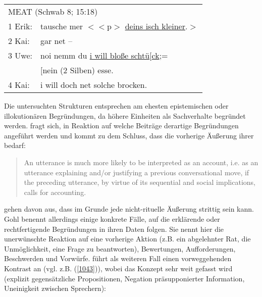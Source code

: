 {\begin{exe}
	\scriptsize
	\ex\label{1042} 
	\begin{tabular}[t]{ll}
	\multicolumn{2}{l}{MEAT (Schwab 8; 15:18)}\\
	1 Erik:	& tausche mer $<<$p$>$ \underline{deins isch kleiner}.$>$\\
	2 Kai: & gar net –\\
	3 Uwe: & noi nemm du \underline{i will bloße schtü$[$ck};=\\
	 & \hspace{5cm}$[$nein (2 Silben) esse.\\
	4 Kai: & i will doch net solche brocken.
	\hfill\hbox{\citet[100]{Gohl2000}} 						 
    \end{tabular}       
\end{exe}														      
Die untersuchten Strukturen entsprechen am ehesten epistemischen oder illokutionären Begründungen, da höhere Einheiten als Sachverhalte begründet werden. \citet[103]{Gohl2000} fragt sich, in Reaktion auf welche Beiträge derartige Begründungen angeführt werden und kommt zu dem Schluss, dass die vorherige Äußerung ihrer bedarf: 

\begin{quotation}
An utterance is much more likely to be interpreted as an account, i.e. as an utterance explaining and/or justifying a previous conversational move, if the preceding utterance, by virtue of its sequential and social implications, calls for accounting.                                                                                             
\end{quotation}
\citet[58, Fn 7]{Breindl2006} gehen davon aus, dass im Grunde jede nicht-rituelle Äußerung strittig sein kann. Gohl benennt allerdings einige konkrete Fälle, auf die erklärende oder rechtfertigende Begründungen in ihren Daten folgen. Sie nennt hier die unerwünschte Reaktion auf eine vorherige Aktion (z.B. ein abgelehnter Rat, die Unmöglichkeit, eine Frage zu beantworten), Bewertungen, Aufforderungen, Beschwerden und Vorwürfe. \citet[289-297]{Ford2000} führt als weiteren Fall einen vorweggehenden Kontrast an (vgl. z.B. (\ref{1043})), wobei das Konzept sehr weit gefasst wird (explizit gegensätzliche Propositionen, Negation präsupponierter Information, Uneinigkeit zwischen Sprechern):

}
